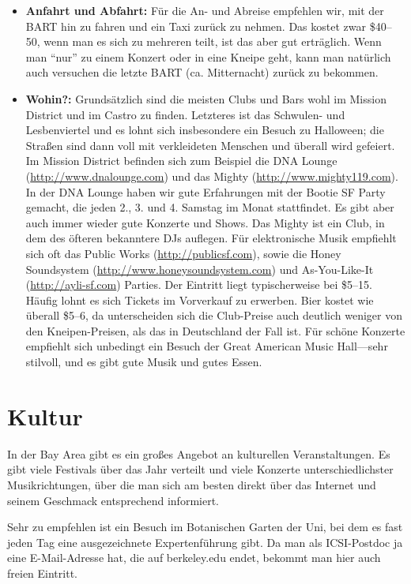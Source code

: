 \documentclass[a4paper]{scrreprt}
\begin{document}
\begin{itemize}

	\item \textbf{Anfahrt und Abfahrt:} Für die An- und Abreise empfehlen wir, mit der BART hin zu fahren und ein Taxi zurück zu nehmen. Das kostet zwar \$40--50, wenn man es sich zu mehreren teilt, ist das aber gut erträglich. Wenn man "`nur"' zu einem Konzert oder in eine Kneipe geht, kann man natürlich auch versuchen die letzte BART (ca. Mitternacht) zurück zu bekommen.

	\item \textbf{Wohin?:} Grundsätzlich sind die meisten Clubs und Bars wohl im Mission District und im Castro zu finden. Letzteres ist das Schwulen- und Lesbenviertel und es lohnt sich insbesondere ein Besuch zu Halloween; die Straßen sind dann voll mit verkleideten Menschen und überall wird gefeiert. Im Mission District befinden sich zum Beispiel die DNA Lounge (\url{http://www.dnalounge.com}) und das Mighty (\url{http://www.mighty119.com}). In der DNA Lounge haben wir gute Erfahrungen mit der Bootie SF Party gemacht, die jeden 2., 3. und 4. Samstag im Monat stattfindet. Es gibt aber auch immer wieder gute Konzerte und Shows. Das Mighty ist ein Club, in dem des öfteren bekanntere DJs auflegen. Für elektronische Musik empfiehlt sich oft das Public Works (\url{http://publicsf.com}), sowie die Honey Soundsystem (\url{http://www.honeysoundsystem.com}) und As-You-Like-It  (\url{http://ayli-sf.com}) Parties. Der Eintritt liegt typischerweise bei \$5--15. Häufig lohnt es sich Tickets im Vorverkauf zu erwerben. Bier kostet wie überall \$5--6, da unterscheiden sich die Club-Preise auch deutlich weniger von den Kneipen-Preisen, als das in Deutschland der Fall ist. Für schöne Konzerte empfiehlt sich unbedingt ein Besuch der Great American Music Hall---sehr stilvoll, und es gibt gute Musik und gutes Essen.

\end{itemize}

\section{Kultur}

In der Bay Area gibt es ein großes Angebot an kulturellen Veranstaltungen. Es gibt viele Festivals über das Jahr verteilt und viele Konzerte unterschiedlichster Musikrichtungen, über die man sich am besten direkt über das Internet und seinem Geschmack entsprechend informiert.

Sehr zu empfehlen ist ein Besuch im Botanischen Garten der Uni, bei dem es fast jeden Tag eine ausgezeichnete Expertenführung gibt. Da man als ICSI-Postdoc ja eine E-Mail-Adresse hat, die auf berkeley.edu endet, bekommt man hier auch freien Eintritt.
\end{document}
